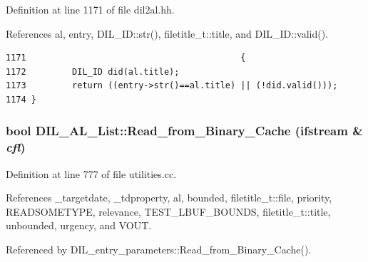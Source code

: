 Definition at line 1171 of file dil2al.hh.

References al, entry, DIL\_\-ID::str(), filetitle\_\-t::title, and DIL\_\-ID::valid().



\footnotesize\begin{verbatim}1171                                          {
1172         DIL_ID did(al.title);
1173         return ((entry->str()==al.title) || (!did.valid()));
1174 }
\end{verbatim}\normalsize 
{}
\subsubsection{\setlength{\rightskip}{0pt plus 5cm}bool DIL\_\-AL\_\-List::Read\_\-from\_\-Binary\_\-Cache (ifstream \& {\em cfl})}\label{classDIL__AL__List_a10}




Definition at line 777 of file utilities.cc.

References \_\-targetdate, \_\-tdproperty, al, bounded, filetitle\_\-t::file, priority, READSOMETYPE, relevance, TEST\_\-LBUF\_\-BOUNDS, filetitle\_\-t::title, unbounded, urgency, and VOUT.

Referenced by DIL\_\-entry\_\-parameters::Read\_\-from\_\-Binary\_\-Cache().



